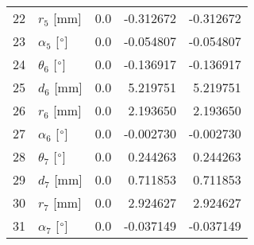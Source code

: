 \documentclass{standalone}%
\begin{document}
\begin{tabular}{llrrr}
22 &              $r_{5}$ [mm] &       0.0 &  -0.312672 &  -0.312672 \\
23 &  $\alpha_{5}$ [$\degree$] &       0.0 &  -0.054807 &  -0.054807 \\
24 &  $\theta_{6}$ [$\degree$] &       0.0 &  -0.136917 &  -0.136917 \\
25 &              $d_{6}$ [mm] &       0.0 &   5.219751 &   5.219751 \\
26 &              $r_{6}$ [mm] &       0.0 &   2.193650 &   2.193650 \\
27 &  $\alpha_{6}$ [$\degree$] &       0.0 &  -0.002730 &  -0.002730 \\
28 &  $\theta_{7}$ [$\degree$] &       0.0 &   0.244263 &   0.244263 \\
29 &              $d_{7}$ [mm] &       0.0 &   0.711853 &   0.711853 \\
30 &              $r_{7}$ [mm] &       0.0 &   2.924627 &   2.924627 \\
31 &  $\alpha_{7}$ [$\degree$] &       0.0 &  -0.037149 &  -0.037149 \\
\bottomrule
\end{tabular}
%
\end{document}
